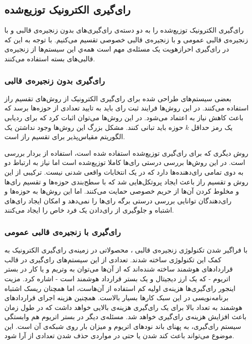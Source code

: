 \subsection{رای‌گیری الکترونیک توزیع‌شده}
رای‌گیری الکترونیک توزیع‌شده را به دو دسته‌ی رای‌گیری‌های بدون زنجیره‌ی قالبی و با زنجیره‌ی قالبی عمومی و با زنجیره‌ی قالبی خصوصی تقسیم می‌کنیم. با توجه به این که در رای‌گیری احرازهویت یک مسئله‌ی مهم است همه‌ي این سیستم‌ها از زنجیره‌ی قالبی‌های بسته استفاده می‌کنند.
\subsubsection{رای‌گیری بدون زنجیره‌ی قالبی} 
بعضی سیستم‌های طراحی شده برای رای‌گیری الکترونیک
\cite{secret1}
\cite{secret2}
\cite{secret3}
از روش‌های تقسیم راز
استفاده می‌کنند. در این روش‌ها فرایند ثبت رای باید به تایید تعدادی از حوزه‌ها برسد که باعث کاهش نیاز به اعتماد می‌شود. در این روش‌ها می‌توان اثبات کرد که برای ردیابی یک رمز حداقل $k$ حوزه باید تبانی کنند. مشکل بزرگ این روش‌ها وجود نداشتن یک الگوریتم مقیاس‌پذیر برای تقسیم راز است.
\par
روش دیگری که برای رای‌گیری توزیع‌شده استفاده شده است، استفاده از بردار‌ بررسی
\cite{checkvector}
است. در این روش‌ها بررسی درستی رای‌ها کاملا توزیع‌شده‌ است اما نیاز به ارتباط دو به دوی تمامی رای‌دهنده‌ها دارد که در یک انتخابات واقعی شدنی نیست. ترکیبی از این روش و تقسیم راز باعث ایجاد پروتکل‌هایی
\cite{MPO1} \cite{evotinwocrypto}
شد که با سطح‌بندی حوزه‌ها و تقسیم رای‌ها و مخلوط کردن آن‌ها از حریم خصوصی حمایت می‌کنند. اما این روش‌ها به حوزه‌ها و رای‌دهندگان توانایی بررسی درستی برگه رای‌ها را نمی‌دهد و امکان ایجاد رای‌های اشتباه و جلوگیری از رای‌دادن یک فرد خاص را ایجاد می‌کنند. 


\subsubsection{رای‌گیری با زنجیره‌ی قالبی عمومی}
با فراگیر شدن تکنولوژی زنجیره‌ی قالبی
\cite{rosgood}
، محصولاتی در زمینه‌ی رای‌گیری الکترونیک به کمک این تکنولوژی ساخته شدند. تعدادی از این سیستم‌های رای‌گیری در قالب قرارداد‌های هوشمند
\cite{SmartContract}
ساخته‌ شنده‌اند که از آن‌ها می‌توان به وتریم 
\cite{votereum}
و یا کار 
\cite{yavuz}
در بستر اتریوم
\cite{Ethereum}
- که یک ارز دیجیتال و یک بستر قرارداد هوشمند است - 
اشاره کرد. مزیت اینجور رای‌گیری‌ها هزینه‌ی اولیه کم استفاده از آن‌هاست، اما همچنان ریسک اشتباه برنامه‌نویسی
\cite{surveyAtt}
\cite{gyges} \cite{smart}
در این سبک کارها بسیار بالاست. همچنین هزینه اجرای قراردادهای هوشمند به تعداد بالا برای یک رای‌گیری هزینه‌ی بالایی خواهد داشت که در طول زمان باعث افزایش هزینه‌ی رای‌گیری خواهد شد. مسئله‌ی دیگر در بستر اتریوم هم وابستگی سیستم رای‌گیری، به پهنای باند نود‌های اتریوم و میزان بار روی شبکه‌ی آن است. این موضوع می‌تواند باعث کند شدن یا حتی در مواردی حذف شدن تعدادی از آرا شود.

